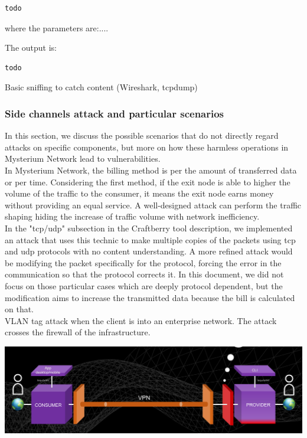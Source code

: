 \documentclass[12pt]{article}
\begin{document}
	\begin{lstlisting}[frame=single]
		todo
	\end{lstlisting}

	where the parameters are:....

	The output is:\\
	
	\begin{lstlisting}[frame=single]
		todo
	\end{lstlisting}
	
	Basic sniffing to catch content (Wireshark, tcpdump)\\

	\subsubsection{Side channels attack and particular scenarios}
	In this section, we discuss the possible scenarios that do not directly regard attacks on specific components, but more on how these harmless operations in Mysterium Network lead to vulnerabilities.\\
	In Mysterium Network, the billing method is per the amount of transferred data or per time. Considering the first method, if the exit node is able to higher the volume of the traffic to the consumer, it means the exit node earns money without providing an equal service. A well-designed attack can perform the traffic shaping hiding the increase of traffic volume with network inefficiency.\\
	In the "tcp/udp" subsection in the Craftberry tool description, we implemented an attack that uses this technic to make multiple copies of the packets using tcp and udp protocols with no content understanding. A more refined attack would be modifying the packet specifically for the protocol, forcing the error in the communication so that the protocol corrects it. In this document, we did not focus on those particular cases which are deeply protocol dependent, but the modification aims to increase the transmitted data because the bill is calculated on that.\\
	
	VLAN tag attack when the client is into an enterprise network. The attack crosses the firewall of the infrastructure.

	\includegraphics[width=\linewidth]{images/client_server_vpn_connection.png}
\end{document}

